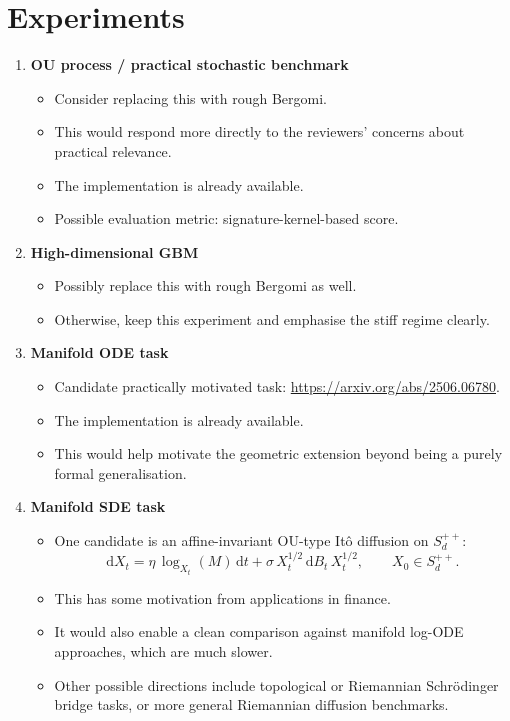 \documentclass{article}
\begin{document}
\section{Experiments}
\begin{enumerate}
    \item \textbf{OU process / practical stochastic benchmark}
    \begin{itemize}
        \item Consider replacing this with rough Bergomi.
        \item This would respond more directly to the reviewers' concerns about practical relevance.
        \item The implementation is already available.
        \item Possible evaluation metric: signature-kernel-based score.
    \end{itemize}

    \item \textbf{High-dimensional GBM}
    \begin{itemize}
        \item Possibly replace this with rough Bergomi as well.
        \item Otherwise, keep this experiment and emphasise the stiff regime clearly.
    \end{itemize}

    \item \textbf{Manifold ODE task}
    \begin{itemize}
        \item Candidate practically motivated task: \url{https://arxiv.org/abs/2506.06780}.
        \item The implementation is already available.
        \item This would help motivate the geometric extension beyond being a purely formal generalisation.
    \end{itemize}

    \item \textbf{Manifold SDE task}
    \begin{itemize}
        \item One candidate is an affine-invariant OU-type It\^o diffusion on $S_d^{++}$:
        \[
        \mathrm dX_t
        =
        \eta\,\log_{X_t}(M)\,\mathrm dt
        +
        \sigma\,X_t^{1/2}\,\mathrm dB_t\,X_t^{1/2},
        \qquad
        X_0 \in S_d^{++}.
        \]
        
        \item This has some motivation from applications in finance.
        
        \item It would also enable a clean comparison against manifold log-ODE approaches, which are much slower.
        
        \item Other possible directions include topological or Riemannian Schr\"odinger bridge tasks, or more general Riemannian diffusion benchmarks.
    \end{itemize}
\end{enumerate}
\end{document}
